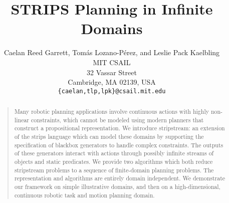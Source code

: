 \documentclass[letterpaper]{article} %
\theoremstyle{plain}\newtheorem{thm}{Theorem}
\theoremstyle{definition}\newtheorem{defn}{Definition}
\theoremstyle{plain}\newtheorem{lem}{Lemma}
\theoremstyle{plain}\newtheorem{cor}{Corollary}
\newcommand{\algname}{{\sc strips}tream}
\newcommand{\strips}{{\sc strips}}
\begin{document}
%
\title{STRIPS Planning in Infinite Domains}

 
 \author{Caelan Reed Garrett, Tom\'as Lozano-P\'erez, and Leslie Pack Kaelbling \\
 MIT CSAIL\\
 32 Vassar Street \\
 Cambridge, MA 02139, USA\\
 {\tt\small \{caelan,tlp,lpk\}@csail.mit.edu}}

\maketitle


\begin{abstract}
\begin{quote}  
  Many robotic planning applications involve continuous
  actions with highly non-linear constraints, which
  cannot be modeled using modern planners that construct a
  propositional representation.  We introduce \algname{}: an
  extension of the \strips{} language which can model these domains
  by supporting the specification of blackbox generators to handle complex constraints. 
  The outputs of these generators interact with actions through possibly infinite streams of
  objects and static predicates. 
  We provide two algorithms which both
  reduce \algname{} problems to a sequence of finite-domain planning
  problems. The representation and algorithms are entirely
  domain independent.  We demonstrate our framework on simple illustrative
  domains, and then on a high-dimensional, continuous robotic task
  and motion planning domain.  
\end{quote}
\end{abstract}
\end{document}
